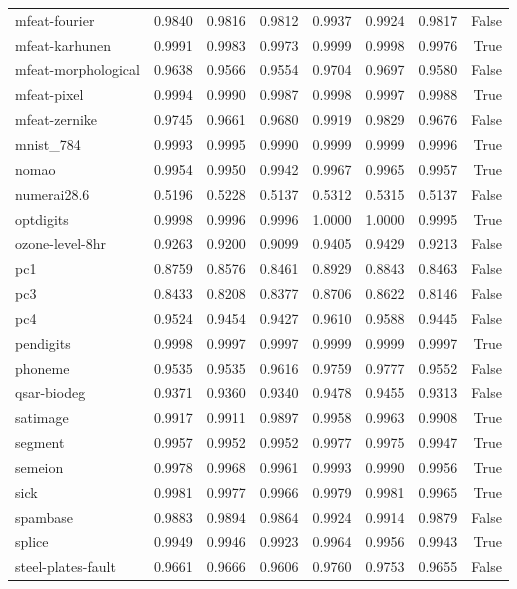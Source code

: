 \begin{table}[htbp]
\begin{tabular}{lrrrrrrr}
mfeat-fourier & 0.9840 & 0.9816 & 0.9812 & 0.9937 & 0.9924 & 0.9817 & False \\
mfeat-karhunen & 0.9991 & 0.9983 & 0.9973 & 0.9999 & 0.9998 & 0.9976 & True \\
mfeat-morphological & 0.9638 & 0.9566 & 0.9554 & 0.9704 & 0.9697 & 0.9580 & False \\
mfeat-pixel & 0.9994 & 0.9990 & 0.9987 & 0.9998 & 0.9997 & 0.9988 & True \\
mfeat-zernike & 0.9745 & 0.9661 & 0.9680 & 0.9919 & 0.9829 & 0.9676 & False \\
mnist\_784 & 0.9993 & 0.9995 & 0.9990 & 0.9999 & 0.9999 & 0.9996 & True \\
nomao & 0.9954 & 0.9950 & 0.9942 & 0.9967 & 0.9965 & 0.9957 & True \\
numerai28.6 & 0.5196 & 0.5228 & 0.5137 & 0.5312 & 0.5315 & 0.5137 & False \\
optdigits & 0.9998 & 0.9996 & 0.9996 & 1.0000 & 1.0000 & 0.9995 & True \\
ozone-level-8hr & 0.9263 & 0.9200 & 0.9099 & 0.9405 & 0.9429 & 0.9213 & False \\
pc1 & 0.8759 & 0.8576 & 0.8461 & 0.8929 & 0.8843 & 0.8463 & False \\
pc3 & 0.8433 & 0.8208 & 0.8377 & 0.8706 & 0.8622 & 0.8146 & False \\
pc4 & 0.9524 & 0.9454 & 0.9427 & 0.9610 & 0.9588 & 0.9445 & False \\
pendigits & 0.9998 & 0.9997 & 0.9997 & 0.9999 & 0.9999 & 0.9997 & True \\
phoneme & 0.9535 & 0.9535 & 0.9616 & 0.9759 & 0.9777 & 0.9552 & False \\
qsar-biodeg & 0.9371 & 0.9360 & 0.9340 & 0.9478 & 0.9455 & 0.9313 & False \\
satimage & 0.9917 & 0.9911 & 0.9897 & 0.9958 & 0.9963 & 0.9908 & True \\
segment & 0.9957 & 0.9952 & 0.9952 & 0.9977 & 0.9975 & 0.9947 & True \\
semeion & 0.9978 & 0.9968 & 0.9961 & 0.9993 & 0.9990 & 0.9956 & True \\
sick & 0.9981 & 0.9977 & 0.9966 & 0.9979 & 0.9981 & 0.9965 & True \\
spambase & 0.9883 & 0.9894 & 0.9864 & 0.9924 & 0.9914 & 0.9879 & False \\
splice & 0.9949 & 0.9946 & 0.9923 & 0.9964 & 0.9956 & 0.9943 & True \\
steel-plates-fault & 0.9661 & 0.9666 & 0.9606 & 0.9760 & 0.9753 & 0.9655 & False \\

\end{tabular}
\end{table}
